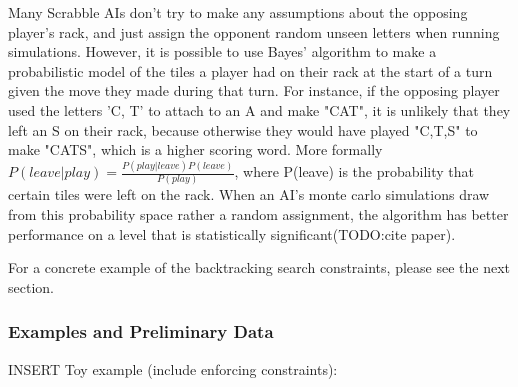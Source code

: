 \documentclass[12pt]{article}
\begin{document}
Many Scrabble AIs don't try to make any assumptions about the opposing
player's rack, and just assign the opponent random unseen letters when
running simulations. However, it is possible to use Bayes' algorithm
to make a probabilistic model of the tiles a player had on their rack
at the start of a turn given the move they made during that turn.%
For instance, if the opposing player used the letters 'C, T' to attach
to an A and make "CAT", it is unlikely that they left an S on their
rack, because otherwise they would have played "C,T,S" to make "CATS",
which is a higher scoring word. More formally $P(leave | play) =
\frac{P(play | leave)P(leave)}{P(play)}$, where P(leave) is the
probability that certain tiles were left on the rack. When an AI's
monte carlo simulations draw from this probability space rather a
random assignment, the algorithm has better performance on a level
that is statistically significant(TODO:cite paper).

	



For a concrete example of the backtracking search constraints, please
see the next section.

\subsubsection*{Examples and Preliminary Data}
INSERT Toy example (include enforcing constraints):
\end{document}
